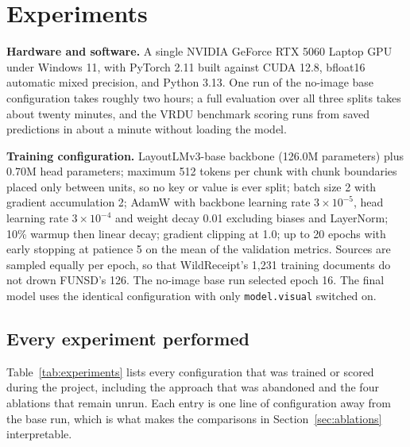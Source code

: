 \documentclass[11pt,a4paper]{article}
\newcommand{\code}[1]{\texttt{\small #1}}
\begin{document}
\section{Experiments}
\label{sec:exp}

\textbf{Hardware and software.} A single NVIDIA GeForce RTX 5060 Laptop GPU under Windows 11,
with PyTorch 2.11 built against CUDA 12.8, bfloat16 automatic mixed precision, and Python 3.13.
One run of the no-image base configuration takes roughly two hours; a full evaluation over all three splits
takes about twenty minutes, and the VRDU benchmark scoring runs from saved predictions in about a
minute without loading the model.

\textbf{Training configuration.} LayoutLMv3-base backbone (126.0M parameters) plus 0.70M head
parameters; maximum 512 tokens per chunk with chunk boundaries placed only between units, so no
key or value is ever split; batch size 2 with gradient accumulation 2; AdamW with backbone
learning rate $3\times10^{-5}$, head learning rate $3\times10^{-4}$ and weight decay 0.01
excluding biases and LayerNorm; 10\% warmup then linear decay; gradient clipping at 1.0; up to 20
epochs with early stopping at patience 5 on the mean of the validation metrics. Sources are
sampled equally per epoch, so that WildReceipt's 1{,}231 training documents do not drown FUNSD's
126. The no-image base run selected epoch 16. The final model uses the identical configuration with
only \code{model.visual} switched on.

\subsection{Every experiment performed}

Table~\ref{tab:experiments} lists every configuration that was trained or scored during the
project, including the approach that was abandoned and the four ablations that remain unrun. Each
entry is one line of configuration away from the base run, which is what makes the comparisons in
Section~\ref{sec:ablations} interpretable.
\end{document}
